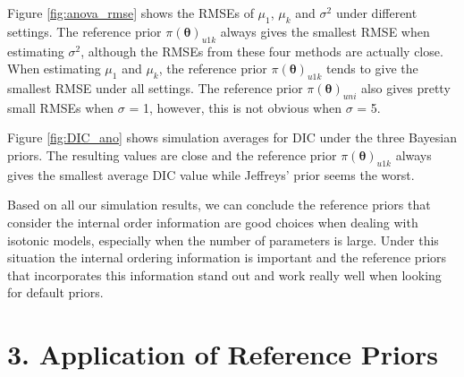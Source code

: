 \documentclass[Proceedings]{ascelike}
\begin{document}
Figure \ref{fig:anova_rmse} shows the RMSEs of $\mu_1$, $\mu_k$ and $\sigma^2$ under different settings. The reference prior $\pi(\pmb\theta)_{u1k}$ always gives the smallest RMSE when estimating $\sigma^2$, although the RMSEs from these four methods are actually close. When estimating $\mu_1$ and $\mu_k$, the reference prior $\pi(\pmb\theta)_{u1k}$ tends to give the smallest RMSE under all settings. The reference prior $\pi(\pmb\theta)_{uni}$ also gives pretty small RMSEs when $\sigma$ = 1, however, this is not obvious when $\sigma$ = 5. 

Figure \ref{fig:DIC_ano} shows simulation averages for DIC under the three Bayesian priors. The resulting values are close and the reference prior $\pi(\pmb\theta)_{u1k}$ always gives the smallest average DIC value while Jeffreys' prior seems the worst.

Based on all our simulation results, we can conclude the reference priors that consider the internal order information are good choices when dealing with isotonic models, especially when the number of parameters is large. Under this situation the internal ordering information is important and the reference priors that incorporates this information stand out and work really well when looking for default priors.
\section{3. Application of Reference Priors}
\end{document}
